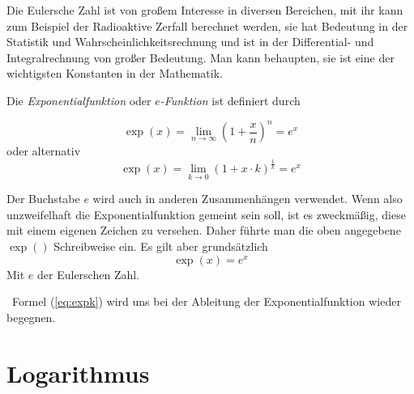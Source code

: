 Die Eulersche Zahl ist von großem Interesse in diversen Bereichen, mit ihr kann zum Beispiel der Radioaktive Zerfall berechnet werden, sie hat Bedeutung in der Statistik und Wahrscheinlichkeitsrechnung und ist in der Differential- und Integralrechnung von großer Bedeutung. Man kann behaupten, sie ist eine der wichtigsten Konstanten in der Mathematik.


\begin{definition}
Die \emph{Exponentialfunktion} oder \emph{$e$-Funktion} ist definiert durch

\begin{equation}\label{eq:expn}
\exp(x) = \lim_{n\rightarrow \infty} \left( 1+\frac{x}{n} \right)^n = e^x
\end{equation}
oder alternativ
\begin{equation}\label{eq:expk}
\exp(x) = \lim_{k\rightarrow 0} \left( 1+x\cdot k \right)^{\frac{1}{k}}= e^x
\end{equation}
\end{definition}
Der Buchstabe $e$ wird auch in anderen Zusammenhängen verwendet. Wenn also unzweifelhaft die Exponentialfunktion gemeint sein soll, ist es zweckmäßig, diese mit einem eigenen Zeichen zu versehen. Daher führte man die oben angegebene $\exp()$ Schreibweise ein. Es gilt aber grundsätzlich
\begin{equation}
\exp(x) = e^x
\end{equation}
Mit $e$ der Eulerschen Zahl.

\HandRight\ Formel (\ref{eq:expk}) wird uns bei der Ableitung der Exponentialfunktion wieder begegnen.

\section{Logarithmus}

